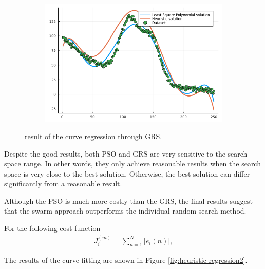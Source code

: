 \documentclass[12pt,a4paper]{article}
\newcommand\abs[1]{\left\lvert#1\right\rvert}
\begin{document}
\begin{figure}[H]\ContinuedFloat
    \centering
    \begin{subfigure}{0.6\textwidth}
        \includegraphics[width=\linewidth]{../figs/grs_regression_result3.png}
    \end{subfigure}
    \caption{result of the curve regression through GRS.}
    \label{fig:global-random-search-fit}
\end{figure}

Despite the good results, both PSO and GRS are very sensitive to the search space range. In other words, they only achieve reasonable results when the search space is very close to the best solution. Otherwise, the best solution can differ significantly from a reasonable result.

Although the PSO is much more costly than the GRS, the final results suggest that the swarm approach outperforms the individual random search method.

For the following cost function
\begin{align}
    J_i^{(m)} = \sum_{n=1}^{N} \abs{e_i (n)},
\end{align}

The results of the curve fitting are shown in Figure \ref{fig:heuristic-regression2}.
\end{document}

